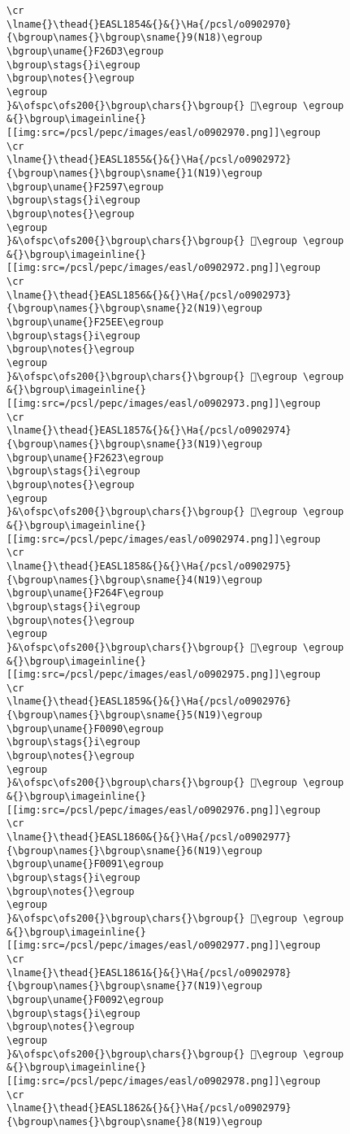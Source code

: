 \begin{verbatim}
\cr
\lname{}\thead{}EASL1854&{}&{}\Ha{/pcsl/o0902970}{\bgroup\names{}\bgroup\sname{}9(N18)\egroup
\bgroup\uname{}F26D3\egroup
\bgroup\stags{}i\egroup
\bgroup\notes{}\egroup
\egroup
}&\ofspc\ofs200{}\bgroup\chars{}\bgroup{} 󲛓\egroup \egroup
&{}\bgroup\imageinline{}[[img:src=/pcsl/pepc/images/easl/o0902970.png]]\egroup
\cr
\lname{}\thead{}EASL1855&{}&{}\Ha{/pcsl/o0902972}{\bgroup\names{}\bgroup\sname{}1(N19)\egroup
\bgroup\uname{}F2597\egroup
\bgroup\stags{}i\egroup
\bgroup\notes{}\egroup
\egroup
}&\ofspc\ofs200{}\bgroup\chars{}\bgroup{} 󲖗\egroup \egroup
&{}\bgroup\imageinline{}[[img:src=/pcsl/pepc/images/easl/o0902972.png]]\egroup
\cr
\lname{}\thead{}EASL1856&{}&{}\Ha{/pcsl/o0902973}{\bgroup\names{}\bgroup\sname{}2(N19)\egroup
\bgroup\uname{}F25EE\egroup
\bgroup\stags{}i\egroup
\bgroup\notes{}\egroup
\egroup
}&\ofspc\ofs200{}\bgroup\chars{}\bgroup{} 󲗮\egroup \egroup
&{}\bgroup\imageinline{}[[img:src=/pcsl/pepc/images/easl/o0902973.png]]\egroup
\cr
\lname{}\thead{}EASL1857&{}&{}\Ha{/pcsl/o0902974}{\bgroup\names{}\bgroup\sname{}3(N19)\egroup
\bgroup\uname{}F2623\egroup
\bgroup\stags{}i\egroup
\bgroup\notes{}\egroup
\egroup
}&\ofspc\ofs200{}\bgroup\chars{}\bgroup{} 󲘣\egroup \egroup
&{}\bgroup\imageinline{}[[img:src=/pcsl/pepc/images/easl/o0902974.png]]\egroup
\cr
\lname{}\thead{}EASL1858&{}&{}\Ha{/pcsl/o0902975}{\bgroup\names{}\bgroup\sname{}4(N19)\egroup
\bgroup\uname{}F264F\egroup
\bgroup\stags{}i\egroup
\bgroup\notes{}\egroup
\egroup
}&\ofspc\ofs200{}\bgroup\chars{}\bgroup{} 󲙏\egroup \egroup
&{}\bgroup\imageinline{}[[img:src=/pcsl/pepc/images/easl/o0902975.png]]\egroup
\cr
\lname{}\thead{}EASL1859&{}&{}\Ha{/pcsl/o0902976}{\bgroup\names{}\bgroup\sname{}5(N19)\egroup
\bgroup\uname{}F0090\egroup
\bgroup\stags{}i\egroup
\bgroup\notes{}\egroup
\egroup
}&\ofspc\ofs200{}\bgroup\chars{}\bgroup{} 󰂐\egroup \egroup
&{}\bgroup\imageinline{}[[img:src=/pcsl/pepc/images/easl/o0902976.png]]\egroup
\cr
\lname{}\thead{}EASL1860&{}&{}\Ha{/pcsl/o0902977}{\bgroup\names{}\bgroup\sname{}6(N19)\egroup
\bgroup\uname{}F0091\egroup
\bgroup\stags{}i\egroup
\bgroup\notes{}\egroup
\egroup
}&\ofspc\ofs200{}\bgroup\chars{}\bgroup{} 󰂑\egroup \egroup
&{}\bgroup\imageinline{}[[img:src=/pcsl/pepc/images/easl/o0902977.png]]\egroup
\cr
\lname{}\thead{}EASL1861&{}&{}\Ha{/pcsl/o0902978}{\bgroup\names{}\bgroup\sname{}7(N19)\egroup
\bgroup\uname{}F0092\egroup
\bgroup\stags{}i\egroup
\bgroup\notes{}\egroup
\egroup
}&\ofspc\ofs200{}\bgroup\chars{}\bgroup{} 󰂒\egroup \egroup
&{}\bgroup\imageinline{}[[img:src=/pcsl/pepc/images/easl/o0902978.png]]\egroup
\cr
\lname{}\thead{}EASL1862&{}&{}\Ha{/pcsl/o0902979}{\bgroup\names{}\bgroup\sname{}8(N19)\egroup

\end{verbatim}
